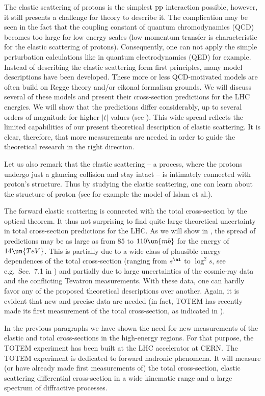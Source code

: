 The elastic scattering of protons is the simplest $\rm pp$ interaction possible, however, it still presents a challenge for theory to describe it. The complication may be seen in the fact that the coupling constant of quantum chromodynamics (QCD) becomes too large for low energy scales (low momentum transfer is characteristic for the elastic scattering of protons). Consequently, one can not apply the simple perturbation calculations like in quantum electrodynamics (QED) for example. Instead of describing the elastic scattering form first principles, many model descriptions have been developed. These more or less QCD-motivated models are often build on Regge theory and/or eikonal formalism grounds. We will discuss several of these models and present their  cross-section predictions for the LHC energies. We will show that the predictions differ considerably, up to several orders of magnitude for higher $|t|$ values (see ). This wide spread reflects the limited capabilities of our present theoretical description of elastic scattering. It is clear, therefore, that more measurements are needed in order to guide the theoretical research in the right direction.

Let us also remark that the elastic scattering -- a process, where the protons undergo just a glancing collision and stay intact -- is intimately connected with proton's structure. Thus by studying the elastic scattering, one can learn about the structure of proton (see for example the model of Islam et al.).

The forward elastic scattering is connected with the total cross-section by the optical theorem. It thus not surprising to find quite large theoretical uncertainty in total cross-section predictions for the LHC. As we will show in , the spread of predictions may be as large as from $85$ to $110\un{mb}$ for the energy of $14\un{TeV}$. This is partially due to a wide class of plausible energy dependences of the total cross-section (ranging from $s^{\al}$ to $\log^2 s$, see e.g.~Sec.~7.1 in ) and partially due to large uncertainties of the cosmic-ray data and the conflicting Tevatron measurements. With these data, one can hardly favor any of the proposed theoretical descriptions over another. Again, it is evident that new and precise data are needed (in fact, TOTEM has recently made its first measurement of the total cross-section, as indicated in ).

In the previous paragraphs we have shown the need for new measurements of the elastic and total cross-sections in the high-energy regions. For that purpose, the TOTEM experiment has been built at the LHC accelerator at CERN. The TOTEM experiment is dedicated to forward hadronic phenomena. It will measure (or have already made first measurements of) the total cross-section, elastic scattering differential cross-section in a wide kinematic range and a large spectrum of diffractive processes.


